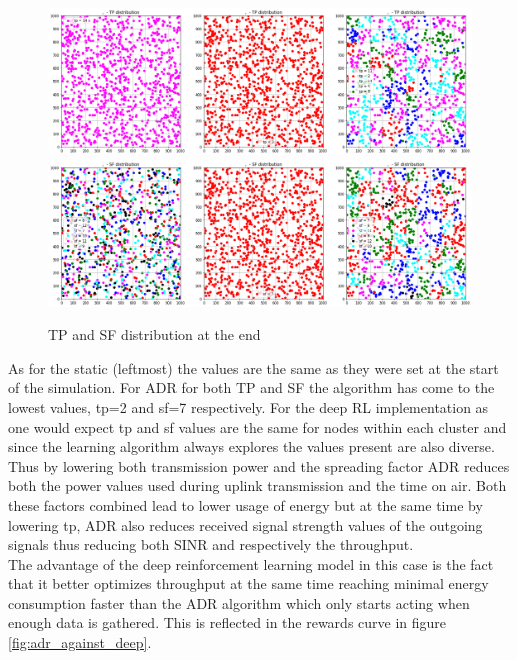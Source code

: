 \begin{figure}[H]
\centering
\hspace*{-1.2cm}  
\includegraphics[scale=0.35]{plots/adr/adr_inspection_tp_distro.png} \\
\hspace*{-1.2cm}  
\includegraphics[scale=0.35]{plots/adr/adr_inspection_sf_distro.png} \\
  \caption{TP and SF distribution at the end}
\end{figure}

As for the static (leftmost) the values are the same as 
they were set at the start of the simulation. For ADR for 
both TP and SF the algorithm has come to the lowest values, tp=2 and sf=7 respectively. For the deep RL 
implementation as one would expect tp and sf values
are the same for nodes within each cluster and since
the learning algorithm always explores the values present
are also diverse. \\

Thus by lowering both transmission power and the spreading
factor ADR reduces both the power values used during 
uplink transmission and the time on air. Both these factors combined lead to lower usage of energy but at the
same time by lowering tp, ADR also reduces received
signal strength values of the outgoing signals thus 
reducing both SINR and respectively the throughput.\\

The advantage of the deep reinforcement learning model
in this case is the fact that it better optimizes 
throughput at the same time reaching minimal energy 
consumption faster than the ADR algorithm which only 
starts acting when enough data is gathered. This is 
reflected in the rewards curve in figure 
\ref{fig:adr_against_deep}.\\

